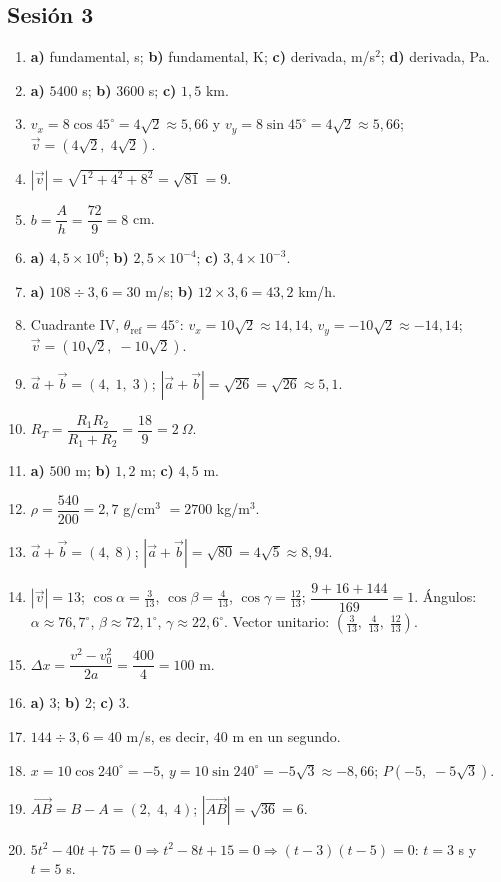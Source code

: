 \documentclass[12pt, letterpaper]{article}
\providecommand{\sen}{\sin}
\begin{document}
\subsection*{Sesión 3}
\begin{enumerate}[leftmargin=*, label=\textbf{\arabic*.}]
  \item \textbf{a)} fundamental, s; \textbf{b)} fundamental, K; \textbf{c)} derivada, m/s$^2$; \textbf{d)} derivada, Pa.
  \item \textbf{a)} $5400$ s; \textbf{b)} $3600$ s; \textbf{c)} $1{,}5$ km.
  \item $v_x=8\cos 45^{\circ}=4\sqrt{2}\approx 5{,}66$ y $v_y=8\sen 45^{\circ}=4\sqrt{2}\approx 5{,}66$; $\vec v=(4\sqrt{2},\; 4\sqrt{2})$.
  \item $|\vec v|=\sqrt{1^2+4^2+8^2}=\sqrt{81}=9$.
  \item $b=\dfrac{A}{h}=\dfrac{72}{9}=8$ cm.
  \item \textbf{a)} $4{,}5 \times 10^{6}$; \textbf{b)} $2{,}5 \times 10^{-4}$; \textbf{c)} $3{,}4 \times 10^{-3}$.
  \item \textbf{a)} $108 \div 3{,}6 = 30$ m/s; \quad \textbf{b)} $12 \times 3{,}6 = 43{,}2$ km/h.
  \item Cuadrante IV, $\theta_{\text{ref}}=45^{\circ}$: $v_x=10\sqrt{2}\approx 14{,}14$, $v_y=-10\sqrt{2}\approx -14{,}14$; $\vec v=(10\sqrt{2},\; -10\sqrt{2})$.
  \item $\vec a+\vec b=(4,\; 1,\; 3)$; $|\vec a+\vec b|=\sqrt{26}=\sqrt{26}\approx 5{,}1$.
  \item $R_T=\dfrac{R_1R_2}{R_1+R_2}=\dfrac{18}{9}=2\ \Omega$.
  \item \textbf{a)} $500$ m; \textbf{b)} $1{,}2$ m; \textbf{c)} $4{,}5$ m.
  \item $\rho=\dfrac{540}{200}=2{,}7$ g/cm$^3$ $=2700$ kg/m$^3$.
  \item $\vec a+\vec b=(4,\; 8)$; $|\vec a+\vec b|=\sqrt{80}=4\sqrt{5}\approx 8{,}94$.
  \item $|\vec v|=13$; $\cos\alpha=\frac{3}{13}$, $\cos\beta=\frac{4}{13}$, $\cos\gamma=\frac{12}{13}$; $\dfrac{9+16+144}{169}=1$. \checkmark\quad Ángulos: $\alpha\approx 76{,}7^{\circ}$, $\beta\approx 72{,}1^{\circ}$, $\gamma\approx 22{,}6^{\circ}$. Vector unitario: $(\frac{3}{13},\; \frac{4}{13},\; \frac{12}{13})$.
  \item $\Delta x=\dfrac{v^2-v_0^2}{2a}=\dfrac{400}{4}=100$ m.
  \item \textbf{a)} 3; \quad \textbf{b)} 2; \quad \textbf{c)} 3.
  \item $144\div 3{,}6=40$ m/s, es decir, $40$ m en un segundo.
  \item $x=10\cos 240^{\circ}=-5$, $y=10\sen 240^{\circ}=-5\sqrt{3}\approx -8{,}66$; $P(-5,\; -5\sqrt{3})$.
  \item $\overrightarrow{AB}=B-A=(2,\; 4,\; 4)$; $|\overrightarrow{AB}|=\sqrt{36}=6$.
  \item $5t^2-40t+75=0\Rightarrow t^2-8t+15=0\Rightarrow(t-3)(t-5)=0$: $t=3$ s y $t=5$ s.
\end{enumerate}
\end{document}
